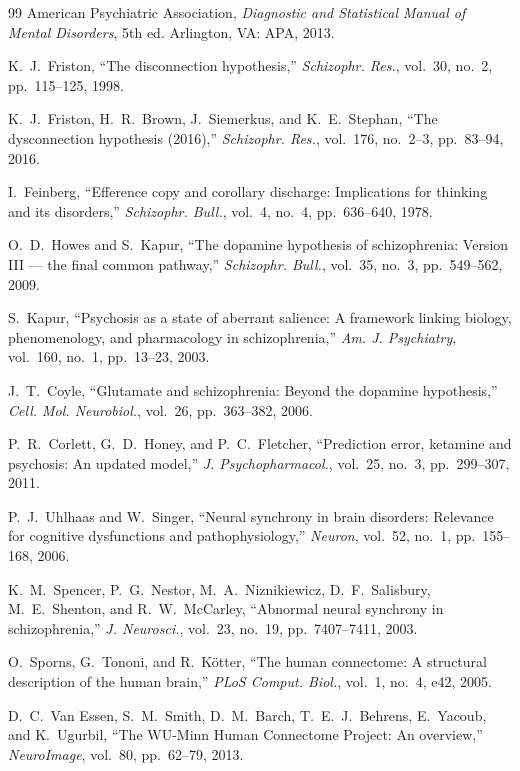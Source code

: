 \documentclass[12pt,a4paper]{article}
\theoremstyle{remark}
\begin{document}
\begin{thebibliography}{99}
American Psychiatric Association, \emph{Diagnostic and Statistical Manual
of Mental Disorders}, 5th ed. Arlington, VA: APA, 2013.

K.~J.~Friston, ``The disconnection hypothesis,'' \emph{Schizophr. Res.},
vol.~30, no.~2, pp.~115--125, 1998.

K.~J.~Friston, H.~R.~Brown, J.~Siemerkus, and K.~E.~Stephan,
``The dysconnection hypothesis (2016),'' \emph{Schizophr. Res.}, vol.~176,
no.~2--3, pp.~83--94, 2016.

I.~Feinberg, ``Efference copy and corollary discharge: Implications for
thinking and its disorders,'' \emph{Schizophr. Bull.}, vol.~4, no.~4,
pp.~636--640, 1978.

O.~D.~Howes and S.~Kapur, ``The dopamine hypothesis of schizophrenia:
Version III --- the final common pathway,'' \emph{Schizophr. Bull.}, vol.~35,
no.~3, pp.~549--562, 2009.

S.~Kapur, ``Psychosis as a state of aberrant salience: A framework linking
biology, phenomenology, and pharmacology in schizophrenia,''
\emph{Am. J. Psychiatry}, vol.~160, no.~1, pp.~13--23, 2003.

J.~T.~Coyle, ``Glutamate and schizophrenia: Beyond the dopamine hypothesis,''
\emph{Cell. Mol. Neurobiol.}, vol.~26, pp.~363--382, 2006.

P.~R.~Corlett, G.~D.~Honey, and P.~C.~Fletcher, ``Prediction error,
ketamine and psychosis: An updated model,'' \emph{J. Psychopharmacol.},
vol.~25, no.~3, pp.~299--307, 2011.

P.~J.~Uhlhaas and W.~Singer, ``Neural synchrony in brain disorders:
Relevance for cognitive dysfunctions and pathophysiology,''
\emph{Neuron}, vol.~52, no.~1, pp.~155--168, 2006.

K.~M.~Spencer, P.~G.~Nestor, M.~A.~Niznikiewicz, D.~F.~Salisbury,
M.~E.~Shenton, and R.~W.~McCarley, ``Abnormal neural synchrony in
schizophrenia,'' \emph{J. Neurosci.}, vol.~23, no.~19, pp.~7407--7411, 2003.

O.~Sporns, G.~Tononi, and R.~K\"{o}tter, ``The human connectome: A structural
description of the human brain,'' \emph{PLoS Comput. Biol.}, vol.~1, no.~4,
e42, 2005.

D.~C.~Van Essen, S.~M.~Smith, D.~M.~Barch, T.~E.~J.~Behrens,
E.~Yacoub, and K.~Ugurbil, ``The WU-Minn Human Connectome Project: An
overview,'' \emph{NeuroImage}, vol.~80, pp.~62--79, 2013.


\end{thebibliography}
\end{document}
